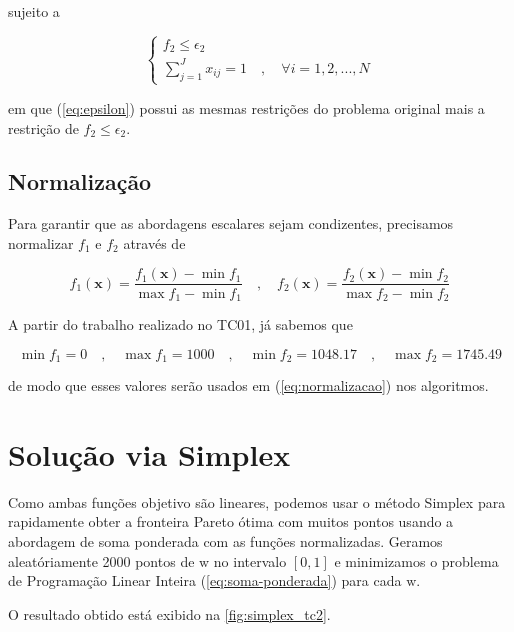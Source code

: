 \documentclass[
	12pt,				%
	oneside,			%
	a4paper,			%
	chapter=TITLE,
	sumario=tradicional,
	english,			%
	brazil				%
]{abntex2}
\begin{document}
\noindent sujeito a 

\begin{equation} \label{eq:rest-epsilon}
    \begin{cases}
      f_2 \leq \epsilon_2 \\
      \sum_{j=1}^{J} x_{ij} = 1 \quad , \quad \forall i = {1, 2, ..., N}
    \end{cases}       
\end{equation}

\noindent em que (\ref{eq:epsilon}) possui as mesmas restrições do problema original
mais a restrição de $f_2 \leq \epsilon_2$.

\section{Normalização}

Para garantir que as abordagens escalares sejam condizentes, precisamos normalizar $f_1$ e $f_2$ 
através de 

\begin{equation} \label{eq:normalizacao}
	f_1(\mathbf{x}) = \frac{f_1(\mathbf{x}) - \min f_1}{\max f_1 - \min f_1}
	\quad , \quad 
	f_2(\mathbf{x}) = \frac{f_2(\mathbf{x}) - \min f_2}{\max f_2 - \min f_2}       
\end{equation}

A partir do trabalho realizado no TC01, já sabemos que 

\[ 
\min f_1 = 0 \quad , \quad 
\max f_1 = 1000 \quad , \quad 
\min f_2 = 1048.17 \quad , \quad 
\max f_2 = 1745.49 
\]

\noindent de modo que esses valores serão usados em (\ref{eq:normalizacao}) 
nos algoritmos.

\chapter{Solução via Simplex}\label{cap:simplex} 

Como ambas funções objetivo são lineares, podemos usar o método Simplex 
para rapidamente obter a fronteira Pareto ótima com muitos pontos usando 
a abordagem de soma ponderada com as funções normalizadas. 
Geramos aleatóriamente 2000 pontos de $\mathrm{w}$ no intervalo $[0, 1]$ e 
minimizamos o problema de Programação Linear Inteira (\ref{eq:soma-ponderada})
para cada $\mathrm{w}$.

O resultado obtido está exibido na \autoref{fig:simplex_tc2}.
\end{document}
